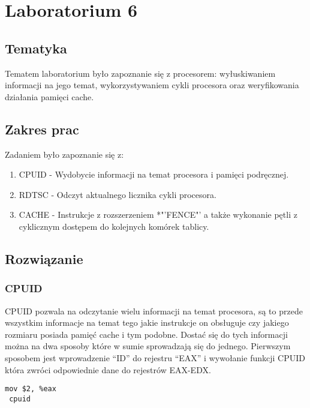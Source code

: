 \chapter{Laboratorium 6}
\section{Tematyka}
Tematem laboratorium było zapoznanie się z procesorem: wyłuskiwaniem informacji na jego temat, wykorzystywaniem cykli procesora oraz weryfikowania działania pamięci cache.
\section{Zakres prac}
Zadaniem było zapoznanie się z:
\begin{enumerate}
	\item CPUID - Wydobycie informacji na temat procesora i pamięci podręcznej.
	\item RDTSC - Odczyt aktualnego licznika cykli procesora.
	\item CACHE - Instrukcje z rozszerzeniem *"'FENCE"' a także wykonanie pętli z cyklicznym dostępem do kolejnych komórek tablicy.
\end{enumerate}
\section{Rozwiązanie}
\subsection{CPUID}
CPUID pozwala na odczytanie wielu informacji na temat procesora, są to przede wszystkim informacje na temat tego jakie instrukcje on obsługuje czy jakiego rozmiaru posiada pamięć cache i tym podobne. Dostać się do tych informacji można na dwa sposoby które w sumie sprowadzają się do jednego. Pierwszym sposobem jest wprowadzenie "`ID"' do rejestru "`EAX"' i wywołanie funkcji CPUID która zwróci odpowiednie dane do rejestrów EAX-EDX. 
\begin{lstlisting}[frame=single, basicstyle=\small, caption=Funkcja CPUID]
 mov $2, %eax
 cpuid
\end{lstlisting}

